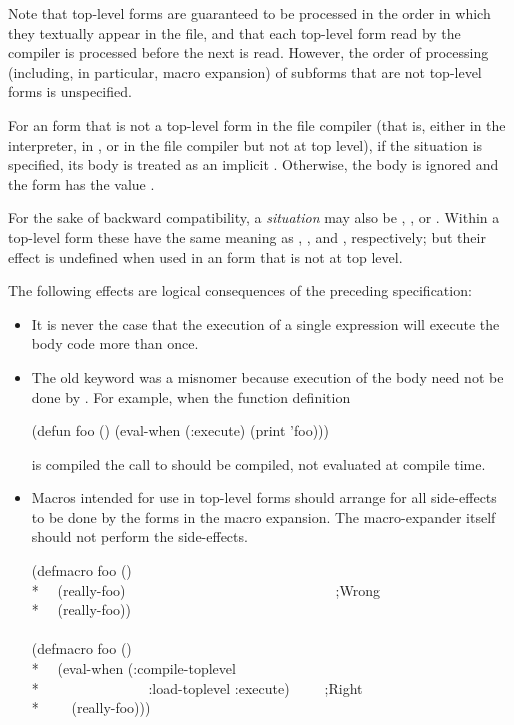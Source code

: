\begin{newer}
\begin{defspec}
  Note that top-level forms are guaranteed to be processed in the order
  in which they textually appear in the file, and that each top-level
  form read by the compiler is processed before the next is read.
  However, the order of processing (including, in particular, macro
  expansion) of subforms that are not top-level forms is unspecified.

  For an  form that is not a top-level form in the file compiler
  (that is, either in the interpreter, in , or in the file
  compiler but not at top level), if the  situation is specified,
  its body is treated as an implicit .  Otherwise, the body
  is ignored and the  form has the value .

  For the sake of backward compatibility,
  a \emph{situation} may also be , , or .
  Within a top-level  form
  these have the same meaning as , ,
  and , respectively; but their effect is undefined when used
  in an  form that is not at top level.

  The following effects are logical consequences of the preceding specification:

  \begin{itemize}
   \item It is never the case that the execution of a single 
     expression will execute the body code more than once.

   \item The old keyword  was a misnomer because execution of
     the body need not be done by .  For example, when the
     function definition
     \begin{lisp}
     (defun foo () (eval-when (:execute) (print 'foo)))
     \end{lisp}
     is compiled
     the call to  should be compiled, not evaluated at compile time.

   \item Macros intended for use in top-level forms should arrange for all
     side-effects to be done by the forms in the macro expansion.
     The macro-expander itself should not perform the side-effects.

\begin{lisp}
(defmacro foo () \\*
~~(really-foo)~~~~~~~~~~~~~~~~~~~~~~~~~~~~~~;{\rm Wrong}\\*
~~{\Xbq}(really-foo)) \\
\\
(defmacro foo () \\*
~~{\Xbq}(eval-when (:compile-toplevel \\*
~~~~~~~~~~~~~~~:load-toplevel :execute)~~~~~;{\rm Right} \\*
~~~~(really-foo)))
\end{lisp}


\end{itemize}
\end{defspec}
\end{newer}
